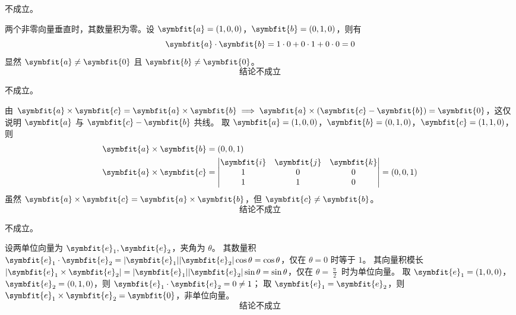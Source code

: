 \begin{solution}
     不成立。

    两个非零向量垂直时，其数量积为零。设 $\symbfit{a} = (1, 0, 0)$，$\symbfit{b} = (0, 1, 0)$，则有
    \begin{equation*}
        \symbfit{a} \cdot \symbfit{b} = 1 \cdot 0 + 0 \cdot 1 + 0 \cdot 0 = 0
    \end{equation*}
    显然 $\symbfit{a} \neq \symbfit{0}$ 且 $\symbfit{b} \neq \symbfit{0}$。
    \begin{equation*}
        \boxed{\text{结论不成立}}
    \end{equation*}

     不成立。

    由 $\symbfit{a} \times \symbfit{c} = \symbfit{a} \times \symbfit{b} \implies \symbfit{a} \times (\symbfit{c} - \symbfit{b}) = \symbfit{0}$，这仅说明 $\symbfit{a}$ 与 $\symbfit{c} - \symbfit{b}$ 共线。
    取 $\symbfit{a} = (1, 0, 0)$，$\symbfit{b} = (0, 1, 0)$，$\symbfit{c} = (1, 1, 0)$，则
    \begin{equation*}
        \begin{aligned}
            \symbfit{a} \times \symbfit{b} & = (0, 0, 1)                                                                                                   \\
            \symbfit{a} \times \symbfit{c} & = \begin{vmatrix} \symbfit{i} & \symbfit{j} & \symbfit{k} \\ 1 & 0 & 0 \\ 1 & 1 & 0 \end{vmatrix} = (0, 0, 1)
        \end{aligned}
    \end{equation*}
    虽然 $\symbfit{a} \times \symbfit{c} = \symbfit{a} \times \symbfit{b}$，但 $\symbfit{c} \neq \symbfit{b}$。
    \begin{equation*}
        \boxed{\text{结论不成立}}
    \end{equation*}

     不成立。

    设两单位向量为 $\symbfit{e}_1, \symbfit{e}_2$，夹角为 $\theta$。
    其数量积 $\symbfit{e}_1 \cdot \symbfit{e}_2 = |\symbfit{e}_1||\symbfit{e}_2|\cos\theta = \cos\theta$，仅在 $\theta = 0$ 时等于 $1$。
    其向量积模长 $|\symbfit{e}_1 \times \symbfit{e}_2| = |\symbfit{e}_1||\symbfit{e}_2|\sin\theta = \sin\theta$，仅在 $\theta = \frac{\uppi}{2}$ 时为单位向量。
    取 $\symbfit{e}_1 = (1, 0, 0)$，$\symbfit{e}_2 = (0, 1, 0)$，则 $\symbfit{e}_1 \cdot \symbfit{e}_2 = 0 \neq 1$；
    取 $\symbfit{e}_1 = \symbfit{e}_2$，则 $\symbfit{e}_1 \times \symbfit{e}_2 = \symbfit{0}$，非单位向量。
    \begin{equation*}
        \boxed{\text{结论不成立}}
    \end{equation*}


\end{solution}
